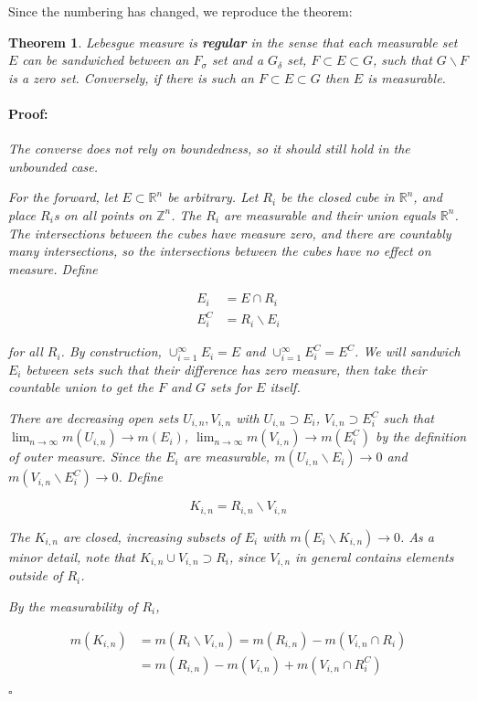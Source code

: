 \documentclass{article}
\newenvironment{proof}{\paragraph{Proof:}}{\hfill$\square$}
\newtheorem{theorem}{Theorem}
\newcommand{\R}{\mathbb{R}}
\newcommand{\Z}{\mathbb{Z}}
\begin{document}
Since the numbering has changed, we reproduce the theorem:

\begin{theorem}
Lebesgue measure is \textbf{regular} in the sense that each measurable set $E$ can be sandwiched between an $F_\sigma$ set and a $G_\delta$ set, $F \subset E \subset G$, such that $G \backslash F$ is a zero set. Conversely, if there is such an $F \subset E \subset G$ then $E$ is measurable.

\begin{proof}
The converse does not rely on boundedness, so it should still hold in the unbounded case.

For the forward, let $E \subset \R^n$ be arbitrary. Let $R_i$ be the closed cube in $\R^n$, and place $R_i$s on all points on $\Z^n$. The $R_i$ are measurable and their union equals $\R^n$. The intersections between the cubes have measure zero, and there are countably many intersections, so the intersections between the cubes have no effect on measure. Define

\begin{align*}
E_i &= E \cap R_i \\
E_i^C &= R_i \backslash E_i
\end{align*}

for all $R_i$. By construction, $\cup_{i=1}^\infty E_i = E$ and $\cup_{i=1}^\infty E_i^C = E^C$. We will sandwich $E_i$ between sets such that their difference has zero measure, then take their countable union to get the $F$ and $G$ sets for $E$ itself.

There are decreasing open sets $U_{i, n}, V_{i, n}$ with $U_{i, n} \supset E_i$, $V_{i, n} \supset E_i^C$ such that $\lim_{n \rightarrow \infty} m(U_{i,n}) \rightarrow m(E_i)$, $\lim_{n \rightarrow \infty} m(V_{i,n}) \rightarrow m(E_i^C)$ by the definition of outer measure. Since the $E_i$ are measurable, $m(U_{i, n} \backslash E_i) \rightarrow 0$ and $m(V_{i, n} \backslash E_i^C) \rightarrow 0$. Define

\[
K_{i, n} = R_{i,n} \backslash V_{i, n}
\]

The $K_{i,n}$ are closed, increasing subsets of $E_i$ with $m(E_i \backslash K_{i,n}) \rightarrow 0$. As a minor detail, note that $K_{i,n} \cup V_{i,n} \supset R_i$, since $V_{i,n}$ in general contains elements outside of $R_i$.

By the measurability of $R_i$,

\begin{align*}
m(K_{i,n}) &= m(R_i \backslash V_{i,n}) = m(R_{i,n}) - m(V_{i,n} \cap R_i) \\
&= m(R_{i,n}) - m(V_{i,n}) + m(V_{i,n} \cap R_i^C)
\end{align*}


\end{proof}
\end{theorem}
\end{document}
